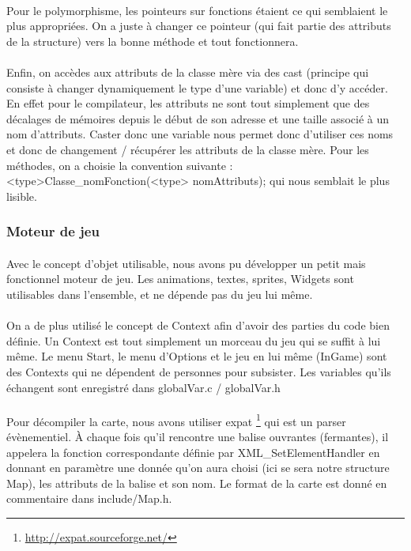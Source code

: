 \paragraph{} Pour le polymorphisme, les pointeurs sur fonctions étaient ce qui semblaient le plus appropriées. On a juste à changer ce pointeur (qui fait partie des attributs de la structure) vers la bonne méthode et tout fonctionnera.
\paragraph{} Enfin, on accèdes aux attributs de la classe mère via des cast (principe qui consiste à changer dynamiquement le type d'une variable) et donc d'y accéder. En effet pour le compilateur, les attributs ne sont tout simplement que des décalages de mémoires depuis le début de son adresse et une taille associé à un nom d'attributs. Caster donc une variable nous permet donc d'utiliser ces noms et donc de changement / récupérer les attributs de la classe mère. Pour les méthodes, on a choisie la convention suivante : <type>Classe\_nomFonction(<type> nomAttributs); qui nous semblait le plus lisible.

\subsubsection{Moteur de jeu}

\paragraph{} Avec le concept d'objet utilisable, nous avons pu développer un petit mais fonctionnel moteur de jeu. Les animations, textes, sprites, Widgets sont utilisables dans l'ensemble, et ne dépende pas du jeu lui même.
\paragraph{} On a de plus utilisé le concept de Context afin d'avoir des parties du code bien définie. Un Context est tout simplement un morceau du jeu qui se suffit à lui même. Le menu Start, le menu d'Options et le jeu en lui même (InGame) sont des Contexts qui ne dépendent de personnes pour subsister. Les variables qu'ils échangent sont enregistré dans globalVar.c / globalVar.h
\paragraph{} Pour décompiler la carte, nous avons utiliser expat \footnote{\url{http://expat.sourceforge.net/}} qui est un parser évènementiel. À chaque fois qu'il rencontre une balise ouvrantes (fermantes), il appelera la fonction correspondante définie par XML\_SetElementHandler en donnant en paramètre une donnée qu'on aura choisi (ici se sera notre structure Map), les attributs de la balise et son nom. Le format de la carte est donné en commentaire dans include/Map.h.
